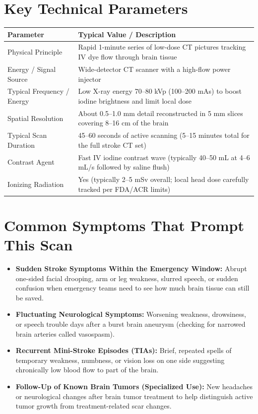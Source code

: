 \section{Key Technical Parameters}
\noindent
\begin{tabularx}{\textwidth}{@{}l X@{}}
\toprule
\textbf{Parameter} & \textbf{Typical Value / Description} \\
\midrule
Physical Principle & Rapid 1-minute series of low-dose CT pictures tracking IV dye flow through brain tissue \\
Energy / Signal Source & Wide-detector CT scanner with a high-flow power injector \\
Typical Frequency / Energy & Low X-ray energy 70--80 kVp (100--200 mAs) to boost iodine brightness and limit local dose \\
Spatial Resolution & About 0.5--1.0 mm detail reconstructed in 5 mm slices covering 8--16 cm of the brain \\
Typical Scan Duration & 45--60 seconds of active scanning (5--15 minutes total for the full stroke CT set) \\
Contrast Agent & Fast IV iodine contrast wave (typically 40--50 mL at 4--6 mL/s followed by saline flush) \\
Ionizing Radiation & Yes (typically 2--5 mSv overall; local head dose carefully tracked per FDA/ACR limits) \\
\bottomrule
\end{tabularx}

\section{Common Symptoms That Prompt This Scan}
\begin{itemize}
    \item \textbf{Sudden Stroke Symptoms Within the Emergency Window:} Abrupt one-sided facial drooping, arm or leg weakness, slurred speech, or sudden confusion when emergency teams need to see how much brain tissue can still be saved.
    \item \textbf{Fluctuating Neurological Symptoms:} Worsening weakness, drowsiness, or speech trouble days after a burst brain aneurysm (checking for narrowed brain arteries called vasospasm).
    \item \textbf{Recurrent Mini-Stroke Episodes (TIAs):} Brief, repeated spells of temporary weakness, numbness, or vision loss on one side suggesting chronically low blood flow to part of the brain.
    \item \textbf{Follow-Up of Known Brain Tumors (Specialized Use):} New headaches or neurological changes after brain tumor treatment to help distinguish active tumor growth from treatment-related scar changes.
\end{itemize}

